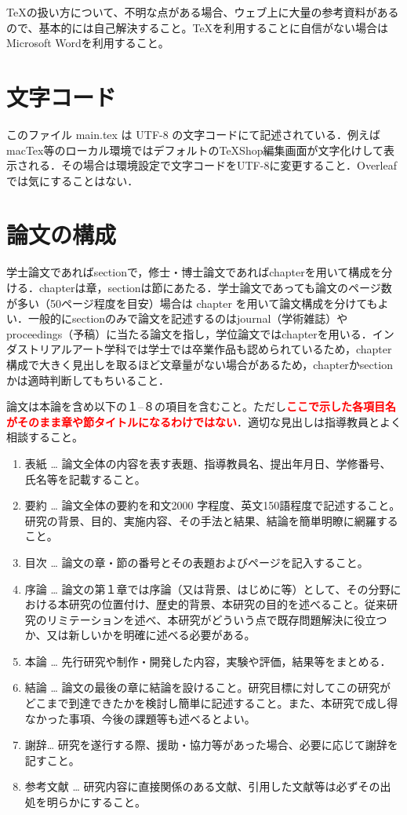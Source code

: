 \documentclass[a4paper,uplatex]{jsarticle}
\begin{document}
\TeX の扱い方について、不明な点がある場合、ウェブ上に大量の参考資料があるので、基本的には自己解決すること。\TeX を利用することに自信がない場合はMicrosoft Wordを利用すること。

\section{文字コード}
このファイル main.tex は UTF-8 の文字コードにて記述されている．例えばmacTex等のローカル環境ではデフォルトのTeXShop編集画面が文字化けして表示される．その場合は環境設定で文字コードをUTF-8に変更すること．Overleafでは気にすることはない．

\section{論文の構成}
学士論文であればsectionで，修士・博士論文であればchapterを用いて構成を分ける．chapterは章，sectionは節にあたる．学士論文であっても論文のページ数が多い（50ページ程度を目安）場合は chapter を用いて論文構成を分けてもよい．一般的にsectionのみで論文を記述するのはjournal（学術雑誌）やproceedings（予稿）に当たる論文を指し，学位論文ではchapterを用いる．インダストリアルアート学科では学士では卒業作品も認められているため，chapter構成で大きく見出しを取るほど文章量がない場合があるため，chapterかsectionかは適時判断してもちいること．

論文は本論を含め以下の１--８の項目を含むこと。ただし\textcolor{red}{\textbf{ここで示した各項目名がそのまま章や節タイトルになるわけではない}}．適切な見出しは指導教員とよく相談すること。
\begin{enumerate}
\item 表紙 … 論文全体の内容を表す表題、指導教員名、提出年月日、学修番号、氏名等を記載すること。
\item 要約 … 論文全体の要約を和文2000 字程度、英文150語程度で記述すること。研究の背景、目的、実施内容、その手法と結果、結論を簡単明瞭に網羅すること。
\item 目次 … 論文の章・節の番号とその表題およびページを記入すること。
\item 序論 … 論文の第１章では序論（又は背景、はじめに等）として、その分野における本研究の位置付け、歴史的背景、本研究の目的を述べること。従来研究のリミテーションを述べ、本研究がどういう点で既存問題解決に役立つか、又は新しいかを明確に述べる必要がある。
\item 本論 … 先行研究や制作・開発した内容，実験や評価，結果等をまとめる．
\item 結論 … 論文の最後の章に結論を設けること。研究目標に対してこの研究がどこまで到達できたかを検討し簡単に記述すること。また、本研究で成し得なかった事項、今後の課題等も述べるとよい。
\item 謝辞… 研究を遂行する際、援助・協力等があった場合、必要に応じて謝辞を記すこと。
\item 参考文献 … 研究内容に直接関係のある文献、引用した文献等は必ずその出処を明らかにすること。
\end{enumerate}
\end{document}
